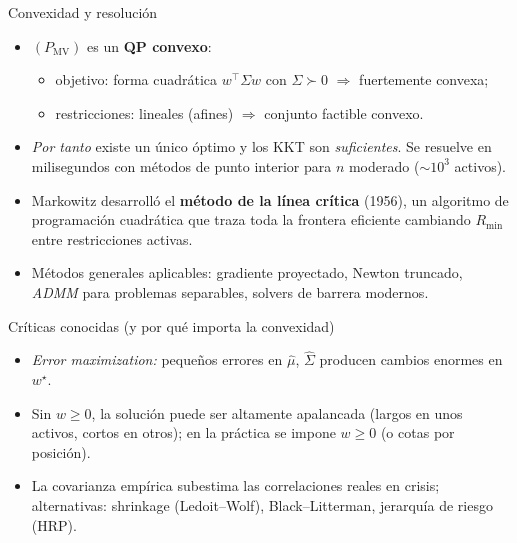 \documentclass[10pt,aspectratio=169]{beamer}
\newcommand{\0}{\mathbf{0}}
\newcommand{\1}{\mathbf{1}}
\begin{document}
\begin{frame}{Convexidad y resolución}
  \begin{itemize}
    \item $(P_{\mathrm{MV}})$ es un \textbf{QP convexo}:
      \begin{itemize}
        \item objetivo: forma cuadrática $w^{\top}\Sigma w$ con
              $\Sigma\succ0$ $\Rightarrow$ fuertemente convexa;
        \item restricciones: lineales (afines) $\Rightarrow$ conjunto
              factible convexo.
      \end{itemize}
    \item \emph{Por tanto} existe un único óptimo y los KKT son
          \emph{suficientes}. Se resuelve en milisegundos con métodos
          de punto interior para $n$ moderado ($\sim10^3$ activos).
    \item Markowitz desarrolló el \textbf{método de la línea crítica}
          (1956), un algoritmo de programación cuadrática que traza
          toda la frontera eficiente cambiando $R_{\min}$ entre
          restricciones activas.
    \item Métodos generales aplicables: gradiente proyectado,
          Newton truncado, \emph{ADMM} para problemas
          separables, solvers de barrera modernos.
  \end{itemize}
  \begin{block}{Críticas conocidas (y por qué importa la convexidad)}
    \begin{itemize}
      \item \emph{Error maximization:} pequeños errores en
            $\hat\mu$, $\hat\Sigma$ producen cambios enormes en $w^\star$.
      \item Sin $w\ge0$, la solución puede ser altamente apalancada
            (largos en unos activos, cortos en otros); en la práctica
            se impone $w\ge0$ (o cotas por posición).
      \item La covarianza empírica subestima las correlaciones reales
            en crisis; alternativas: shrinkage (Ledoit--Wolf),
            Black--Litterman, jerarquía de riesgo (HRP).
    \end{itemize}
  \end{block}
\end{frame}

\end{document}
